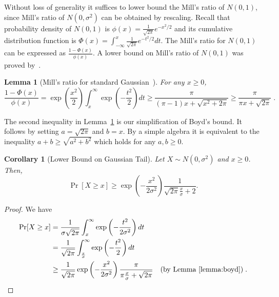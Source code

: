 \documentclass{article}
\newtheorem{lemma}[theorem]{Lemma}
\newtheorem{corollary}[theorem]{Corollary}
\begin{document}
Without loss of generality it suffices to lower bound the Mill's ratio of $N(0,1)$,
since Mill's ratio of $N(0,\sigma^2)$ can be obtained by rescaling.  Recall that
probability density of $N(0,1)$ is $\phi(x) = \frac{1}{\sqrt{2 \pi}}
e^{-x^2/2}$ and its cumulative distribution function is $\Phi(x) =
\int_{-\infty}^x \frac{1}{\sqrt{2 \pi}} e^{-t^2/2} dt$.  The Mill's ratio for
$N(0,1)$ can be expressed as $\frac{1 - \Phi(x)}{\phi(x)}$. A lower bound on
Mill's ratio of $N(0,1)$ was proved by~\cite{Boyd-1959}.
%
\begin{lemma}[Mill's ratio for standard Gaussian~\citep{Boyd-1959}]
\label{lemma:boyd}
For any $x \ge 0$,
$$
\frac{1 - \Phi(x)}{\phi(x)}
= \exp\left(\frac{x^2}{2}\right) \int_x^{\infty} \exp\left(-\frac{t^2}{2}\right) dt
\ge \frac{\pi}{(\pi-1)x+\sqrt{x^2+2 \pi}}
\ge \frac{\pi}{\pi x + \sqrt{2\pi}} \; .
$$
\end{lemma}
The second inequality in Lemma~\ref{lemma:boyd} is our simplification of Boyd's
bound.  It follows by setting $a=\sqrt{2 \pi}$ and $b=x$. By a simple algebra
it is equivalent to the inequality $a + b \ge \sqrt{a^2 + b^2}$ which holds for
any $a,b \ge 0$.
%
\begin{corollary}[Lower Bound on Gaussian Tail]
Let $X \sim N(0, \sigma^2)$ and $x \ge 0$. Then,
$$
\Pr[X \ge x] \ge \exp\left(-\frac{x^2}{2 \sigma^2}\right) \frac{1}{\sqrt{2\pi}\frac{x}{\sigma}+2}.
$$
\end{corollary}
%
\begin{proof}
We have
\begin{align*}
\Pr[X \ge x]
& = \frac{1}{\sigma \sqrt{2 \pi}} \int_x^{\infty} \exp \left( -\frac{t^2}{2 \sigma^2} \right) d t \\
& = \frac{1}{\sqrt{2 \pi}} \int_\frac{x}{\sigma}^{\infty} \exp \left( -\frac{t^2}{2} \right) d t \\
& \ge \frac{1}{\sqrt{2 \pi}} \exp\left(-\frac{x^2}{2 \sigma^2}\right) \frac{\pi}{\pi\frac{x}{\sigma}+\sqrt{2 \pi}} & \text{(by Lemma~\ref{lemma:boyd})} \; .
\end{align*}
\end{proof}
\end{document}
